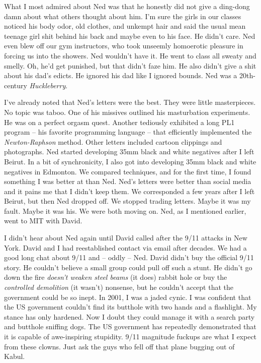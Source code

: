 What I most admired about Ned was that he honestly did not give a
ding-dong damn about what others thought about him. I'm sure the girls
in our classes noticed his body odor, old clothes, and unkempt hair and
said the usual mean teenage girl shit behind his back and maybe even to
his face. He didn't care. Ned even blew off our gym instructors, who
took unseemly homoerotic pleasure in forcing us into the showers. Ned
wouldn't have it. He went to class all sweaty and smelly. Oh, he'd get
punished, but that didn't faze him. He also didn't give a shit about his
dad's edicts. He ignored his dad like I ignored bounds. Ned was a
20th-century \emph{Huckleberry}.

I've already noted that Ned's letters were the best. They were little
masterpieces. No topic was taboo. One of his missives outlined his
masturbation experiments. He was on a perfect orgasm quest. Another
tediously exhibited a long PL1 program -- his favorite programming
language -- that efficiently implemented the \emph{Newton-Raphson}
method. Other letters included cartoon clippings and photographs. Ned
started developing 35mm black and white negatives after I left Beirut.
In a bit of synchronicity, I also got into developing 35mm black and
white negatives in Edmonton. We compared techniques, and for the first
time, I found something I was better at than Ned. Ned's letters were
better than social media and it pains me that I didn't keep them. We
corresponded a few years after I left Beirut, but then Ned dropped off.
We stopped trading letters. Maybe it was my fault. Maybe it was his. We
were both moving on. Ned, as I mentioned earlier, went to MIT with
David.

I didn't hear about Ned again until David called after the 9/11 attacks
in New York. David and I had reestablished contact via email after
decades. We had a good long chat about 9/11 and -- oddly -- Ned. David
didn't buy the official 9/11 story. He couldn't believe a small group
could pull off such a stunt. He didn't go down the fire \emph{doesn't
weaken steel beams} (it does) rabbit hole or buy the \emph{controlled
demolition} (it wasn't) nonsense, but he couldn't accept that the
government could be so inept. In 2001, I was a jaded cynic. I was
confident that the US government couldn't find its butthole with two
hands and a flashlight. My stance has only hardened. Now I doubt they
could manage it with a search party and butthole sniffing dogs. The US
government has repeatedly demonstrated that it is capable of
awe-inspiring stupidity. 9/11 magnitude fuckups are what I expect from
these clowns. Just ask the guys who fell off that plane bugging out of
Kabul.

